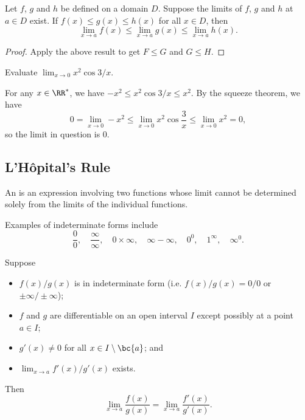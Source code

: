 \begin{theorem}
    Let $f$, $g$ and $h$ be defined on a domain $D$. Suppose the limits of $f$, $g$ and $h$ at $a \in D$ exist. If $f(x) \leq g(x) \leq h(x)$ for all $x \in D$, then \[\lim_{x \to a} f(x) \leq \lim_{x \to a} g(x) \leq \lim_{x \to a} h(x).\]
\end{theorem}
\begin{proof}
    Apply the above result to get $F \leq G$ and $G \leq H$.
\end{proof}

\begin{sample}
    Evaluate $\lim_{x \to 0} x^2 \cos{3/x}$.
\end{sample}
\begin{sampans}
    For any $x \in \RR^{\ast}$, we have $-x^2 \leq x^2 \cos{3/x} \leq x^2$. By the squeeze theorem, we have \[0 = \lim_{x \to 0} -x^2 \leq \lim_{x \to 0} x^2 \cos{\frac3x} \leq \lim_{x \to 0} x^2 = 0,\] so the limit in question is 0.
\end{sampans}

\subsection{L'H\^{o}pital's Rule}

\begin{definition}
    An  is an expression involving two functions whose limit cannot be determined solely from the limits of the individual functions.
\end{definition}

Examples of indeterminate forms include \[\frac{0}{0}, \quad \frac{\infty}{\infty}, \quad 0 \times \infty, \quad \infty - \infty, \quad 0^0, \quad 1^\infty, \quad \infty^0.\]

\begin{theorem}
    Suppose
    \begin{itemize}
        \item $f(x)/g(x)$ is in indeterminate form (i.e. $f(x)/g(x) = 0/0$ or $\pm \infty/\pm \infty$);
        \item $f$ and $g$ are differentiable on an open interval $I$ except possibly at a point $a \in I$;
        \item $g'(x) \neq 0$ for all $x \in I \setminus \bc{a}$; and
        \item $\lim_{x \to a} f'(x)/g'(x)$ exists.
    \end{itemize}
    Then \[\lim_{x \to a} \frac{f(x)}{g(x)} = \lim_{x \to a} \frac{f'(x)}{g'(x)}.\]
\end{theorem}

